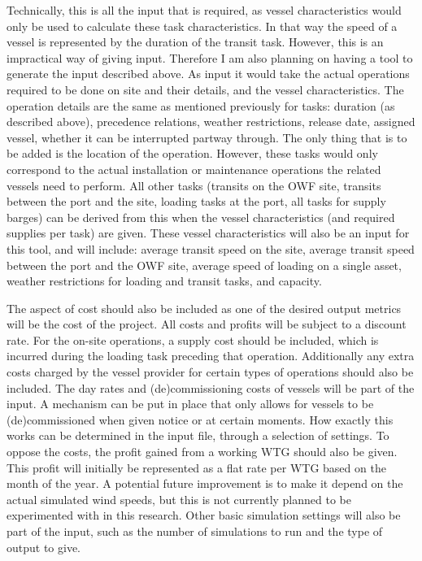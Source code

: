 \documentclass[a4paper,12pt]{article}
\begin{document}
Technically, this is all the input that is required, as vessel characteristics would only be used to calculate these task characteristics. In that way the speed of a vessel is represented by the duration of the transit task. However, this is an impractical way of giving input. Therefore I am also planning on having a tool to generate the input described above. As input it would take the actual operations required to be done on site and their details, and the vessel characteristics. The operation details are the same as mentioned previously for tasks: duration (as described above), precedence relations, weather restrictions, release date, assigned vessel, whether it can be interrupted partway through. The only thing that is to be added is the location of the operation. However, these tasks would only correspond to the actual installation or maintenance operations the related vessels need to perform. All other tasks (transits on the OWF site, transits between the port and the site, loading tasks at the port, all tasks for supply barges) can be derived from this when the vessel characteristics (and required supplies per task) are given. These vessel characteristics will also be an input for this tool, and will include: average transit speed on the site, average transit speed between the port and the OWF site, average speed of loading on a single asset, weather restrictions for loading and transit tasks, and capacity. 

The aspect of cost should also be included as one of the desired output metrics will be the cost of the project. All costs and profits will be subject to a discount rate. For the on-site operations, a supply cost should be included, which is incurred during the loading task preceding that operation. Additionally any extra costs charged by the vessel provider for certain types of operations should also be included. The day rates and (de)commissioning costs of vessels will be part of the input. A mechanism can be put in place that only allows for vessels to be (de)commissioned when given notice or at certain moments. How exactly this works can be determined in the input file, through a selection of settings. To oppose the costs, the profit gained from a working WTG should also be given. This profit will initially be represented as a flat rate per WTG based on the month of the year. A potential future improvement is to make it depend on the actual simulated wind speeds, but this is not currently planned to be experimented with in this research. Other basic simulation settings will also be part of the input, such as the number of simulations to run and the type of output to give.
\end{document}
